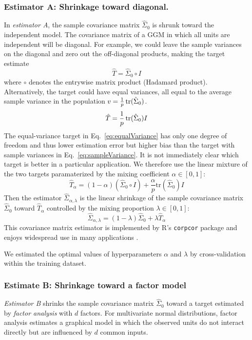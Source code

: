 \subsubsection*{Estimator A: Shrinkage toward diagonal.}
In \emph{estimator A}, the sample covariance matrix $\hat\Sigma_0$ is shrunk toward the independent model.  The covariance matrix of a GGM in which all units are independent will be diagonal.  
For example, we  could leave the sample variances on the diagonal and zero out the off-diagonal products, making the target estimate 
\begin{equation}\label{eq:sampleVariance}
\hat T= \hat\Sigma_0\circ I
\end{equation}
where $\circ$ denotes the entrywise matrix product (Hadamard product). 
Alternatively, the target could have equal variances, all equal to the average sample variance in the population $v = \frac 1 p \operatorname{tr}(\hat\Sigma_0)$.
\begin{equation}\label{eq:equalVariance}
\hat T=\frac 1 p \operatorname{tr}(\hat\Sigma_0) I
\end{equation}
The equal-variance target in Eq.~\ref{eq:equalVariance} has only one degree of freedom and thus lower estimation error but higher bias than the target with sample variances in Eq.~\ref{eq:sampleVariance}. It is not immediately clear which target is better in a particular application. We therefore use the linear mixture of the two targets paramaterized by the mixing coefficient $\alpha\in[0,1]$:
\begin{equation}
\hat T_\alpha = (1-\alpha)(\hat\Sigma_0 \circ I) + \frac \alpha p \mbox{tr}(\hat \Sigma_0)I
\end{equation}
Then the estimator $\hat\Sigma_{\alpha,\lambda}$ is the linear shrinkage of the sample covariance matrix $\hat\Sigma_0$ toward $\hat T_\alpha$ controlled by the mixing proportion $\lambda\in[0,1]$:
\begin{equation}
\hat\Sigma_{\alpha,\lambda} = (1-\lambda)\hat\Sigma_0 + \lambda\hat T_\alpha 
\end{equation}
This covariance matrix estimator is implemented by R's {\tt corpcor} package \cite{Schaefer:2010} and enjoys widespread use in many applications \cite{Schafer:2005}.

We estimated the optimal values of hyperparameters $ \alpha$ and $ \lambda$  by  cross-validation within the training dataset.  

\subsubsection*{Estimate B: Shrinkage toward a factor model}
\emph{Estimator B} shrinks the sample covariance matrix $\hat\Sigma_0$ toward a target estimated by \emph{factor analysis} with $d$ factors. For multivariate normal distributions, factor analysis estimates a graphical model in which the observed units do not interact directly but are influenced by $d$ common inputs.

